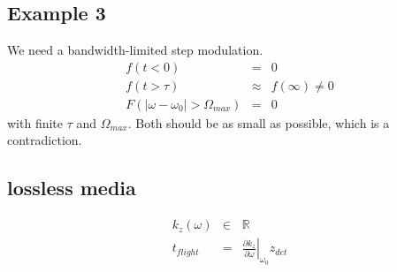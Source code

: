 \documentclass[12pt,a4paper,twoside,openright,BCOR10mm,headsepline,titlepage,abstracton,chapterprefix,final]{scrreprt}
\newcommand\wavenumber{k}
\begin{document}
\subsection{Example 3}
We need a bandwidth-limited step modulation.
\begin{eqnarray}
 f( t < 0 ) &=& 0 \\
 f( t > \tau) &\approx& f(\infty) \neq 0 \\
 F(|\omega - \omega_0| > \Omega_{max}) &=& 0
\end{eqnarray}
with finite $\tau$ and $\Omega_{max}$.
Both should be as small as possible, which is a contradiction.

\subsection{lossless media}
\begin{eqnarray}
 \wavenumber_z(\omega) &\in& \mathbb{R} \\
 t_{flight} &=& \left. \frac{\partial \wavenumber_z}{\partial \omega}\right|_{\omega_0} z_{det}
\end{eqnarray}
\end{document}
